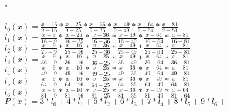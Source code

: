 "\documentclass{article}
\begin{document}
        $l_0(x)=\frac{x-16}{ 9-16}*\frac{x-25}{ 9-25}*\frac{x-36}{ 9-36}*\frac{x-49}{ 9-49}*\frac{x-64}{ 9-64}*\frac{x-81}{ 9-81}$ \\ $l_1(x)=\frac{x-9}{ 16-9}*\frac{x-25}{ 16-25}*\frac{x-36}{ 16-36}*\frac{x-49}{ 16-49}*\frac{x-64}{ 16-64}*\frac{x-81}{ 16-81}$ \\ $l_2(x)=\frac{x-9}{ 25-9}*\frac{x-16}{ 25-16}*\frac{x-36}{ 25-36}*\frac{x-49}{ 25-49}*\frac{x-64}{ 25-64}*\frac{x-81}{ 25-81}$ \\ $l_3(x)=\frac{x-9}{ 36-9}*\frac{x-16}{ 36-16}*\frac{x-25}{ 36-25}*\frac{x-49}{ 36-49}*\frac{x-64}{ 36-64}*\frac{x-81}{ 36-81}$ \\ $l_4(x)=\frac{x-9}{ 49-9}*\frac{x-16}{ 49-16}*\frac{x-25}{ 49-25}*\frac{x-36}{ 49-36}*\frac{x-64}{ 49-64}*\frac{x-81}{ 49-81}$ \\ $l_5(x)=\frac{x-9}{ 64-9}*\frac{x-16}{ 64-16}*\frac{x-25}{ 64-25}*\frac{x-36}{ 64-36}*\frac{x-49}{ 64-49}*\frac{x-81}{ 64-81}$ \\ $l_6(x)=\frac{x-9}{ 81-9}*\frac{x-16}{ 81-16}*\frac{x-25}{ 81-25}*\frac{x-36}{ 81-36}*\frac{x-49}{ 81-49}*\frac{x-64}{ 81-64}$
        $P(x)=3*l_0+4*l_1+5*l_2+6*l_3+7*l_4+8*l_5+9*l_6+$
        
\end{document}
